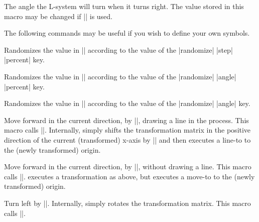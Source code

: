 \begin{command}{\pgfdeclarelindenmayersystem{}}
\begin{command}{\symbol{}}
\begin{command}{\pgflsystemcurrentrightangle}
	The angle the L-system will turn when it turns right. 
	The value stored in this macro may be changed if 
	|\pgflsystemrandomizerightangle| is used. 
\end{command}


The following commands may be useful if you wish to define your own
symbols.

\begin{command}{\pgflsystemrandomizestep}
	Randomizes the value in |\pgflsystemcurrentstep| according to the 
	value of the |randomize| |step| |percent| key.
\end{command}

\begin{command}{\pgflsystemrandomizeleftangle}
	Randomizes the value in |\pgflsystemcurrentleftangle| according to
	the value of the |randomize| |angle| |percent| key.
\end{command}

\begin{command}{\pgflsystemrandomizerightangle}
	Randomizes the value in |\pgflsystemcurrentrightangle| according 
	to the value of	the |randomize| |angle| key.
\end{command}

\begin{command}{\pgflsystemdrawforward}
	Move forward in the current direction, by |\pgflsystemcurrentstep|,
	drawing a line in the process. This macro calls 
	|\pgflsystemrandomizestep|. Internally, \pgfname{} simply
	shifts the transformation matrix in the positive direction of 
	the current (transformed) x-axis by |\pgflsystemstep| 
	and then executes	a line-to to the (newly transformed) origin.
\end{command}

\begin{command}{\pgflsystemmoveforward}
	Move forward in the current direction, by |\pgflsystemcurrentstep|,
	without drawing a line. This macro calls 
	|\pgflsystemrandomizestep|. \pgfname{} executes a transformation
	as above, but executes	a move-to to the (newly transformed) 
	origin.
\end{command}

\begin{command}{\pgflsystemturnleft}
  Turn left by |\pgflsystemcurrentleftangle|. Internally, \pgfname{}
	simply rotates the transformation matrix. This macro calls 
	|\pgflsystemrandomizeleftangle|. 
\end{command}


\end{command}
\end{command}
